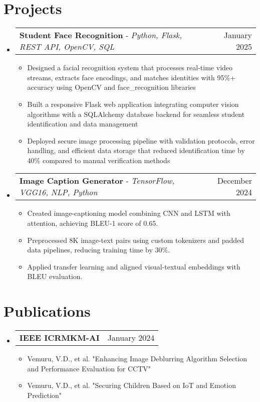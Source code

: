 \documentclass[letterpaper,10.5pt]{article}
\makeatletter
\newcommand{\resumeItem}[1]{
  \item\small{
    {#1 \vspace{-3pt}}
  }
}
\newcommand{\resumeProjectHeading}[2]{
    \item
    \begin{tabular*}{0.97\textwidth}{l@{\extracolsep{\fill}}r}
      \small#1 & #2 \\
    \end{tabular*}\vspace{-5pt}
}
\newcommand{\resumePublicationsHeading}[2]{
    \item
    \begin{tabular*}{0.97\textwidth}{l@{\extracolsep{\fill}}r}
      \small#1 & #2 \\
    \end{tabular*}\vspace{-6pt}
}
\newcommand{\resumeSubHeadingListStart}{\begin{itemize}[leftmargin=*]}
\newcommand{\resumeSubHeadingListEnd}{\end{itemize}}
\newcommand{\resumeItemListStart}{\begin{itemize}}
\newcommand{\resumeItemListEnd}{\end{itemize}\vspace{-6pt}}
\makeatother
\begin{document}
\section{Projects}
    \resumeSubHeadingListStart
      \resumeProjectHeading
          {\textbf{Student Face Recognition} - \emph{Python, Flask, REST API, OpenCV, SQL}}{January 2025}
          \resumeItemListStart
            \resumeItem{Designed a facial recognition system that processes real-time video streams, extracts face encodings, and matches identities with 95\%+ accuracy using OpenCV and face\_recognition libraries}
            \resumeItem{Built a responsive Flask web application integrating computer vision algorithms with a SQLAlchemy database backend for seamless student identification and data management}
            \resumeItem{Deployed secure image processing pipeline with validation protocols, error handling, and efficient data storage that reduced identification time by 40\% compared to manual verification methods}
          \resumeItemListEnd
      \resumeProjectHeading
          {\textbf{Image Caption Generator} - \emph{TensorFlow, VGG16, NLP, Python}}{December 2024}
          \resumeItemListStart
            \resumeItem{Created image-captioning model combining CNN and LSTM with attention, achieving BLEU-1 score of 0.65.}
            \resumeItem{Preprocessed 8K image-text pairs using custom tokenizers and padded data pipelines, reducing training time by 30\%.}
            \resumeItem{Applied transfer learning and aligned visual-textual embeddings with BLEU evaluation.}
          \resumeItemListEnd
    \resumeSubHeadingListEnd

\section{Publications}
    \resumeSubHeadingListStart
      \resumePublicationsHeading
          {\textbf{IEEE ICRMKM-AI}}{January 2024}
          \resumeItemListStart
            \resumeItem{Vemuru, V.D., et al. "Enhancing Image Deblurring Algorithm Selection and Performance Evaluation for CCTV"}
            \resumeItem{Vemuru, V.D., et al. "Securing Children Based on IoT and Emotion Prediction"}
          \resumeItemListEnd
    \resumeSubHeadingListEnd
\end{document}
